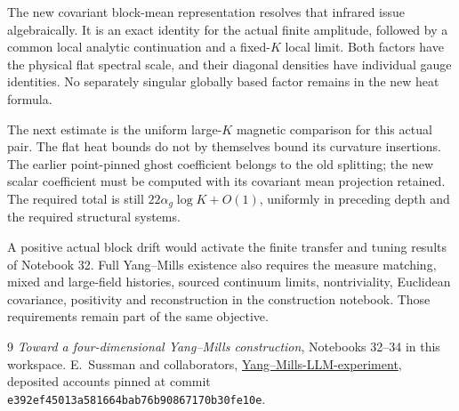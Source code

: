 \documentclass[11pt]{article}
\theoremstyle{remark}
\begin{document}
The new covariant block-mean representation resolves
that infrared issue algebraically. It is an exact
identity for the actual finite amplitude, followed
by a common local analytic continuation and a
fixed-\(K\) local limit. Both factors have the
physical flat spectral scale, and their diagonal
densities have individual gauge identities.
No separately singular globally based factor
remains in the new heat formula.

The next estimate is the uniform large-\(K\)
magnetic comparison for this actual pair. The
flat heat bounds do not by themselves bound
its curvature insertions. The earlier point-pinned
ghost coefficient belongs to the old splitting;
the new scalar coefficient must be computed
with its covariant mean projection retained.
The required total is still
\(22\alpha_g\log K+O(1)\), uniformly in preceding
depth and the required structural systems.

A positive actual block drift would activate the
finite transfer and tuning results of Notebook 32.
Full Yang--Mills existence also requires the
measure matching, mixed and large-field histories,
sourced continuum limits, nontriviality, Euclidean
covariance, positivity and reconstruction in the
construction notebook. Those requirements remain
part of the same objective.

\begin{thebibliography}{9}
\emph{Toward a four-dimensional Yang--Mills construction},
Notebooks 32--34 in this workspace.
E.~Sussman and collaborators,
\href{https://github.com/ethanwsussman/Yang--Mills-LLM-experiment}
{Yang--Mills-LLM-experiment}, deposited accounts pinned at
commit \texttt{e392ef45013a581664bab76b90867170b30fe10e}.
\end{thebibliography}
\end{document}
